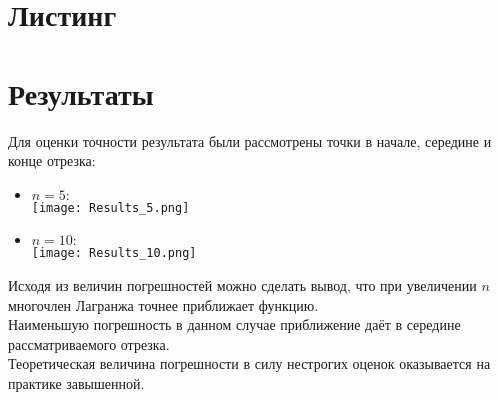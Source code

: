 \documentclass[12pt,a4paper]{article}
\begin{document}
	\section{Листинг}
	
	\section{Результаты}
	Для оценки точности результата были рассмотрены точки в начале, середине и конце отрезка:
	\begin{itemize}
		\item $n = 5:$ \\
		\texttt{[image: Results\_5.png]}
		\item $n = 10:$ \\
		\texttt{[image: Results\_10.png]}
	\end{itemize}
	Исходя из величин погрешностей можно сделать вывод, что при увеличении $n$ многочлен Лагранжа точнее приближает функцию. \\
	Наименьшую погрешность в данном случае приближение даёт в середине рассматриваемого отрезка. \\
	Теоретическая величина погрешности в силу нестрогих оценок оказывается на практике завышенной. 
\end{document}
